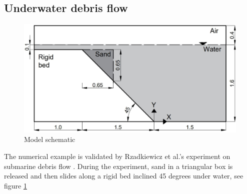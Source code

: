\documentclass[preprint,12pt]{elsarticle}
\begin{document}
\subsection{\textsf{Underwater debris flow}}
%
%
\begin{figure}[h]
\center
\includegraphics[scale=.3]{SandBoxscheme.jpg}
\caption{Model schematic}
\label{fig:SandBoxModel}
\end{figure}
%
%
The numerical example is validated by Rzadkiewicz et al.'s experiment on submarine debris flow \cite{Rzadkiewicz}. During the experiment, sand in a triangular box is released and then slides along a rigid bed inclined 45 degrees under water, see figure \ref{fig:SandBoxModel}  \\
%
%
\end{document}
